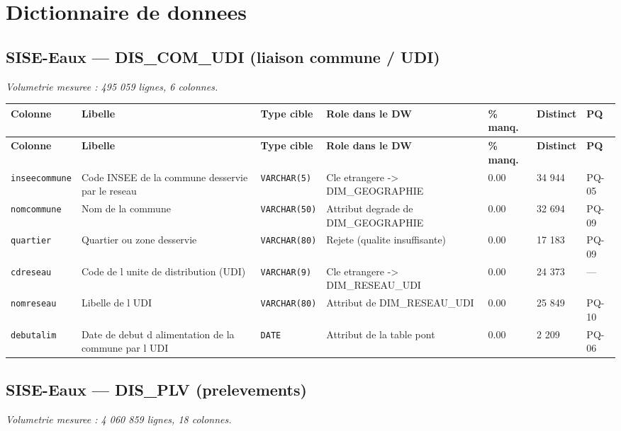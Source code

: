 \section{Dictionnaire de donnees}

\subsection{SISE-Eaux --- DIS\_COM\_UDI (liaison commune / UDI)}
\noindent\textit{Volumetrie mesuree : 495 059 lignes, 6 colonnes.}\par\smallskip

{\footnotesize\setlength{\tabcolsep}{3pt}
\begin{longtable}{@{}p{2.6cm}p{3.5cm}p{1.9cm}p{3.1cm}p{1.1cm}p{1.3cm}p{0.9cm}@{}}
\toprule
\textbf{Colonne} & \textbf{Libelle} & \textbf{Type cible} & \textbf{Role dans le DW} & \textbf{\% manq.} & \textbf{Distinct} & \textbf{PQ} \\
\midrule \endfirsthead
\toprule \textbf{Colonne} & \textbf{Libelle} & \textbf{Type cible} & \textbf{Role dans le DW} & \textbf{\% manq.} & \textbf{Distinct} & \textbf{PQ} \\ \midrule \endhead
\bottomrule \endfoot
\texttt{inseecommune} & Code INSEE de la commune desservie par le reseau & \texttt{VARCHAR(5)} & Cle etrangere -> DIM\_GEOGRAPHIE & 0.00 & 34 944 & PQ-05 \\
\texttt{nomcommune} & Nom de la commune & \texttt{VARCHAR(50)} & Attribut degrade de DIM\_GEOGRAPHIE & 0.00 & 32 694 & PQ-09 \\
\texttt{quartier} & Quartier ou zone desservie & \texttt{VARCHAR(80)} & Rejete (qualite insuffisante) & 0.00 & 17 183 & PQ-09 \\
\texttt{cdreseau} & Code de l unite de distribution (UDI) & \texttt{VARCHAR(9)} & Cle etrangere -> DIM\_RESEAU\_UDI & 0.00 & 24 373 & --- \\
\texttt{nomreseau} & Libelle de l UDI & \texttt{VARCHAR(80)} & Attribut de DIM\_RESEAU\_UDI & 0.00 & 25 849 & PQ-10 \\
\texttt{debutalim} & Date de debut d alimentation de la commune par l UDI & \texttt{DATE} & Attribut de la table pont & 0.00 & 2 209 & PQ-06 \\
\end{longtable}}

\subsection{SISE-Eaux --- DIS\_PLV (prelevements)}
\noindent\textit{Volumetrie mesuree : 4 060 859 lignes, 18 colonnes.}\par\smallskip


